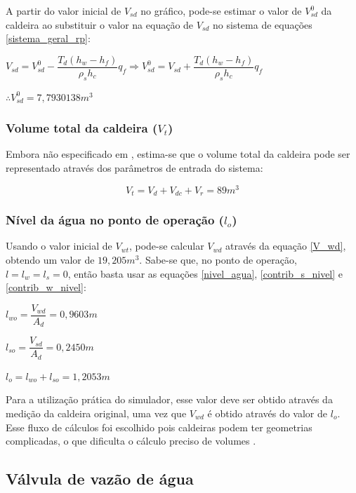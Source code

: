 A partir do valor inicial de $V_{sd}$ no gráfico, pode-se estimar o
valor de $V_{sd}^0$ da caldeira ao substituir o valor na equação de
$V_{sd}$ no sistema de equações \ref{sistema_geral_rp}:

\begin{center}
  $V_{sd} = V_{sd}^0 - \dfrac{T_d ( h_w - h_f )} {\rho_s h_c} q_f
  \Rightarrow V_{sd}^0 = V_{sd} + \dfrac{T_d ( h_w - h_f )} {\rho_s
    h_c} q_f$

  $ \therefore V_{sd}^0 = 7,7930138 m^3 $  
\end{center}

\subsubsection{Volume total da caldeira ($V_t$)}

Embora não especificado em , estima-se que o volume
total da caldeira pode ser representado através dos parâmetros de
entrada do sistema:

\begin{equation}
  V_t = V_d + V_{dc} + V_r = 89 m^3
  \label{V_t_params}
\end{equation}

\subsubsection{Nível da água no ponto de operação ($l_o$)}

Usando o valor inicial de $V_{wt}$, pode-se calcular $V_{wd}$ através
da equação \ref{V_wd}, obtendo um valor de $19,205 m^3$. Sabe-se que,
no ponto de operação, $l=l_w=l_s=0$, então basta usar as equações
\ref{nivel_agua}, \ref{contrib_s_nivel} e \ref{contrib_w_nivel}:

\begin{center}
  $l_{wo} = \dfrac{V_{wd}}{A_d} = 0,9603 m$
  
  $l_{so} = \dfrac{V_{sd}}{A_d} = 0,2450 m$
  
  $l_o = l_{wo} + l_{so} = 1,2053 m$
\end{center}

Para a utilização prática do simulador, esse valor deve ser obtido
através da medição da caldeira original, uma vez que $V_{wd}$ é obtido
através do valor de $l_o$. Esse fluxo de cálculos foi escolhido pois
caldeiras podem ter geometrias complicadas, o que dificulta o cálculo
preciso de volumes \cite{astrom}.

\subsection{Válvula de vazão de água}

